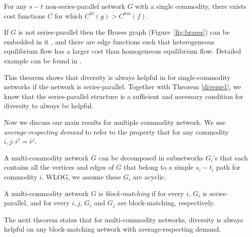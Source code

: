 \begin{theorem}
For any $s-t$ non-series-parallel network $G$ with a single commodity, there exists cost functions $C$ for which $C^{ht}(g)> C^{hm}(f)$.
\label{diversethm2}
\end{theorem}

\begin{proof-sketch}
    If $G$ is not series-parallel then the Braess graph (Figure~\ref{fig:braess}) can be embedded in it \cite{Valdes:1979:RSP:800135.804393} , and there are edge functions such that heterogeneous equilibrium flow has a larger cost than homogeneous equilibrium flow. Detailed example can be found in \cite{ijcai2018-24}.
\end{proof-sketch}

This theorem shows that diversity is always helpful in for single-commodity networks if the network is series-parallel. Together with Theorem \ref{diverse1}, we know that the series-parallel structure is a sufficient and necessary condition for diversity to always be helpful.

Now we discuss our main results for multiple commodity network. We use {\it average-respecting demand} to refer to the property that for any commodity $i,j: \bar{r}^i=\bar{r}^j$. 

A multi-commodity network $G$ can be decomposed in subnetworks $G_i$'s that each contains all the vertices and edges of $G$ that belong to a simple $s_i-t_i$ path for commodity $i$. WLOG, we assume these $G_i$ are acyclic.

\begin{definition}
    A multi-commodity network $G$ is {\it block-matching} if for every $i$, $G_i$ is series-parallel, and for every $i, j$, $G_i$ and $G_j$ are block-matching, respectively. 
\end{definition}

The next theorem states that for multi-commodity networks, diversity is always helpful on any block-matching network with average-respecting demand. 

